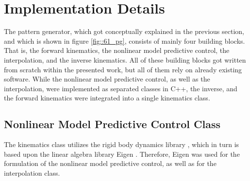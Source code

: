 \section{Implementation Details}
\label{sec::62_id}
The pattern generator, which got conceptually explained in the previous section, and which is shown in figure \ref{fig::61_pg}, consists of mainly four building blocks. That is, the forward kinematics, the nonlinear model predictive control, the interpolation, and the inverse kinematics. All of these building blocks got written from scratch within the presented work, but all of them rely on already existing software. While the nonlinear model predictive control, as well as the interpolation, were implemented as separated classes in C++, the inverse, and the forward kinematics were integrated into a single kinematics class.
\FloatBarrier
\subsection{Nonlinear Model Predictive Control Class}
The kinematics class utilizes the rigid body dynamics library \cite{felis2017rbdl}, which in turn is based upon the linear algebra library Eigen \cite{eigenweb}. Therefore, Eigen was used for the formulation of the nonlinear model predictive control, as well as for the interpolation class.

